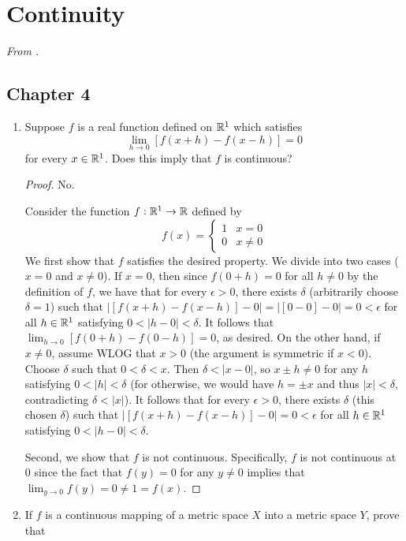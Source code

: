 \documentclass[../psets.tex]{subfiles}
\begin{document}
\section{Continuity}
\emph{From \textcite{bib:Rudin}.}
\subsection*{Chapter 4}
\begin{enumerate}[label={\textbf{\arabic*.}}]
    \item {}Suppose $f$ is a real function defined on $\mathbb{R}^1$ which satisfies
    \begin{equation*}
        \lim_{h\to 0}[f(x+h)-f(x-h)] = 0
    \end{equation*}
    for every $x\in\mathbb{R}^1$. Does this imply that $f$ is continuous?
    \begin{proof}
        No.\par
        Consider the function $f:\mathbb{R}^1\to\mathbb{R}$ defined by
        \begin{equation*}
            f(x) =
            \begin{cases}
                1 & x=0\\
                0 & x\neq 0
            \end{cases}
        \end{equation*}
        We first show that $f$ satisfies the desired property. We divide into two cases ($x=0$ and $x\neq 0$). If $x=0$, then since $f(0+h)=0$ for all $h\neq 0$ by the definition of $f$, we have that for every $\epsilon>0$, there exists $\delta$ (arbitrarily choose $\delta=1$) such that $|[f(x+h)-f(x-h)]-0|=|[0-0]-0|=0<\epsilon$ for all $h\in\mathbb{R}^1$ satisfying $0<|h-0|<\delta$. It follows that $\lim_{h\to 0}[f(0+h)-f(0-h)]=0$, as desired. On the other hand, if $x\neq 0$, assume WLOG that $x>0$ (the argument is symmetric if $x<0$). Choose $\delta$ such that $0<\delta<x$. Then $\delta<|x-0|$, so $x\pm h\neq 0$ for any $h$ satisfying $0<|h|<\delta$ (for otherwise, we would have $h=\pm x$ and thus $|x|<\delta$, contradicting $\delta<|x|$). It follows that for every $\epsilon>0$, there exists $\delta$ (this chosen $\delta$) such that $|[f(x+h)-f(x-h)]-0|=0<\epsilon$ for all $h\in\mathbb{R}^1$ satisfying $0<|h-0|<\delta$.\par
        Second, we show that $f$ is not continuous. Specifically, $f$ is not continuous at 0 since the fact that $f(y)=0$ for any $y\neq 0$ implies that $\lim_{y\to 0}f(y)=0\neq 1=f(x)$.
    \end{proof}
    \item If $f$ is a continuous mapping of a metric space $X$ into a metric space $Y$, prove that

\end{enumerate}
\end{document}
